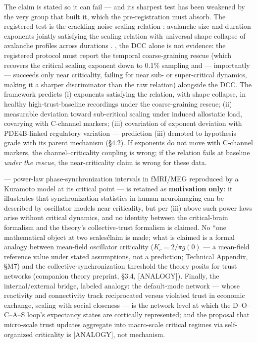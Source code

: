 \documentclass[11pt,twocolumn]{article}
\theoremstyle{plain}
\begin{document}
The claim is stated so it can fail — and its sharpest test has been weakened by the very group that built it, which the pre-registration must absorb. The registered test is the crackling-noise scaling relation \citep{sethna2001}: avalanche size and duration exponents jointly satisfying the scaling relation with universal shape collapse of avalanche profiles across durations \citep{friedman2012}. \citet{srinivasan2024}, the DCC alone is not evidence: the registered protocol must report the temporal coarse-graining rescue (which recovers the critical scaling exponent down to 0.1\% sampling and — importantly — succeeds only near criticality, failing for near sub- or super-critical dynamics, making it a sharper discriminator than the raw relation) alongside the DCC. The framework predicts (i) exponents satisfying the relation, with shape collapse, in healthy high-trust-baseline recordings under the coarse-graining rescue; (ii) measurable deviation toward sub-critical scaling under induced allostatic load, covarying with C-channel markers; (iii) covariation of exponent deviation with PDE4B-linked regulatory variation — prediction (iii) demoted to hypothesis grade with its parent mechanism (\S{}4.2). If exponents do not move with C-channel markers, the channel–criticality coupling is wrong; if the relation fails at baseline \textit{under the rescue}, the near-criticality claim is wrong for these data.

\citet{kitzbichler2009} — power-law phase-synchronization intervals in fMRI/MEG reproduced by a Kuramoto model at its critical point — is retained as \textbf{motivation only}: it illustrates that synchronization statistics in human neuroimaging can be described by oscillator models near criticality, but per (iii) above such power laws arise without critical dynamics, and no identity between the critical-brain formalism and the theory's collective-trust formalism is claimed. No ``one mathematical object at two scales\'\' claim is made; what is claimed is a formal analogy between mean-field oscillator criticality ($K_c = 2/\pi g(0)$ — a mean-field reference value under stated assumptions, not a prediction; Technical Appendix, \S{}M7) and the collective-synchronization threshold the theory posits for trust networks (companion theory preprint, \S{}3.4, [ANALOGY]). Finally, the internal/external bridge, labeled analogy: the default-mode network — whose reactivity and connectivity track reciprocated versus violated trust in economic exchange, scaling with social closeness \citep{fareri2020} — is the network level at which the D–O–C–A–S loop's expectancy states are cortically represented; and the proposal that micro-scale trust updates aggregate into macro-scale critical regimes via self-organized criticality is [ANALOGY], not mechanism.
\end{document}
